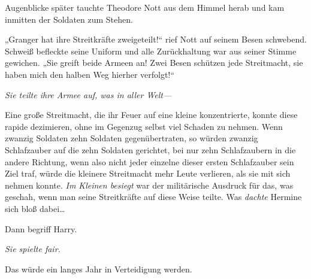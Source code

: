 Augenblicke später tauchte Theodore Nott aus dem Himmel herab und kam inmitten der Soldaten zum Stehen.

„Granger hat ihre Streitkräfte zweigeteilt!“ rief Nott auf seinem Besen schwebend. Schweiß befleckte seine Uniform und alle Zurückhaltung war aus seiner Stimme gewichen.
„Sie greift beide Armeen an! Zwei Besen schützen jede Streitmacht, sie haben mich den halben Weg hierher verfolgt!“

\emph{Sie teilte ihre Armee auf, was in aller Welt—}

Eine große Streitmacht, die ihr Feuer auf eine kleine konzentrierte, konnte diese rapide dezimieren, ohne im Gegenzug selbst viel Schaden zu nehmen. Wenn zwanzig Soldaten zehn Soldaten gegenübertraten, so würden zwanzig Schlafzauber auf die zehn Soldaten gerichtet, bei nur zehn Schlafzaubern in die andere Richtung, wenn also nicht jeder einzelne dieser ersten Schlafzauber sein Ziel traf, würde die kleinere Streitmacht mehr Leute verlieren, als sie mit sich nehmen konnte. \emph{Im Kleinen besiegt} war der militärische Ausdruck für das, was geschah, wenn man seine Streitkräfte auf diese Weise teilte. Was \emph{dachte} Hermine sich bloß dabei…%

Dann begriff Harry.

\emph{Sie spielte fair.}

Das würde ein langes Jahr in Verteidigung werden.

